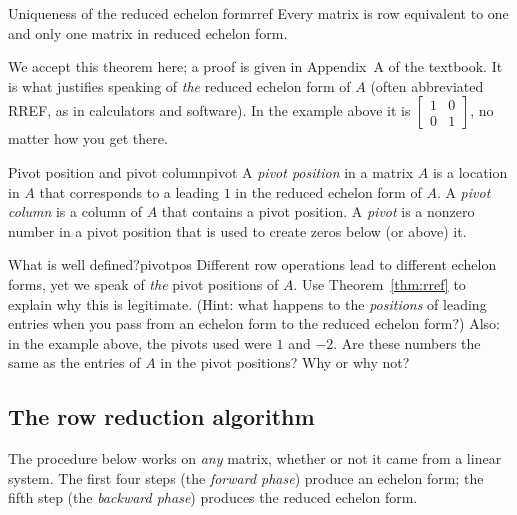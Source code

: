 \documentclass[11pt]{article}
\begin{document}
\begin{thm}{Uniqueness of the reduced echelon form}{rref}
Every matrix is row equivalent to one and only one matrix in reduced echelon form.
\end{thm}
 
We accept this theorem here; a proof is given in Appendix~A of the textbook. It is what justifies
speaking of \emph{the} reduced echelon form of $A$ (often abbreviated RREF, as in calculators and
software). In the example above it is $\begin{bmatrix}1&0\\0&1\end{bmatrix}$, no matter how you get there.
 
\begin{defn}{Pivot position and pivot column}{pivot}
A \emph{pivot position} in a matrix $A$ is a location in $A$ that corresponds to a leading $1$ in the reduced
echelon form of $A$. A \emph{pivot column} is a column of $A$ that contains a pivot position. A \emph{pivot}
is a nonzero number in a pivot position that is used to create zeros below (or above) it.
\end{defn}
 
\begin{think}{What is well defined?}{pivotpos}
Different row operations lead to different echelon forms, yet we speak of \emph{the} pivot positions of $A$.
Use Theorem~\ref{thm:rref} to explain why this is legitimate. (Hint: what happens to the \emph{positions} of
leading entries when you pass from an echelon form to the reduced echelon form?)
Also: in the example above, the pivots used were $1$ and $-2$. Are these numbers the same as the entries of
$A$ in the pivot positions? Why or why not?
\end{think}
 
\subsection*{The row reduction algorithm}
 
The procedure below works on \emph{any} matrix, whether or not it came from a linear system. The
first four steps (the \emph{forward phase}) produce an echelon form; the fifth step (the
\emph{backward phase}) produces the reduced echelon form.
 
\end{document}
